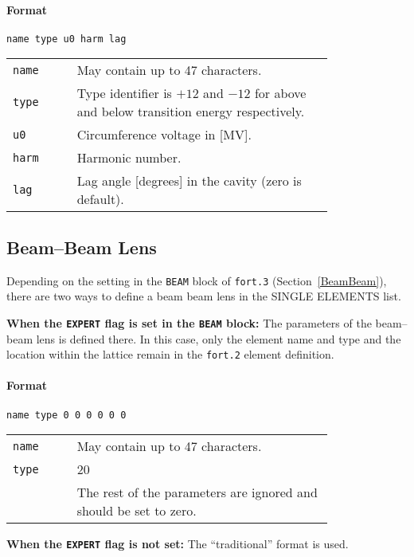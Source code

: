 \paragraph{Format} \texttt{name type u0 harm lag}

\bigskip
\begin{tabular}{@{}lp{0.8\linewidth}}
    \texttt{name} & May contain up to 47 characters. \\
    \texttt{type} & Type identifier is $+12$ and $-12$ for above and below transition energy respectively. \\
    \texttt{u0}   & Circumference voltage in [MV]. \\
    \texttt{harm} & Harmonic number. \\
    \texttt{lag}  & Lag angle [degrees] in the cavity (zero is default).
\end{tabular}

\subsection{Beam--Beam Lens} \label{BBS}

Depending on the setting in the \texttt{BEAM} block of \texttt{fort.3} (Section~\ref{BeamBeam}), there are two ways to define a beam beam lens in the SINGLE ELEMENTS list.

\bigskip
\noindent\textbf{When the \texttt{EXPERT} flag is set in the \texttt{BEAM} block:}
The parameters of the beam--beam lens is defined there.
In this case, only the element name and type and the location within the lattice remain in the \texttt{fort.2} element definition.

\paragraph{Format} \texttt{name type 0 0 0 0 0 0}

\bigskip
\begin{tabular}{@{}lp{0.8\linewidth}}
    \texttt{name} & May contain up to 47 characters. \\
    \texttt{type} & 20 \\
    \texttt{}     & The rest of the parameters are ignored and should be set to zero.
\end{tabular}

\bigskip
\noindent\textbf{When the \texttt{EXPERT} flag is not set:}
The ``traditional'' format is used.

